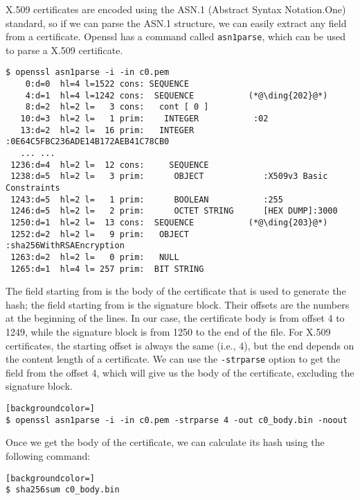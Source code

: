 X.509 certificates are encoded using the ASN.1 (Abstract Syntax Notation.One) standard, 
so if we can parse the ASN.1 structure, we can easily extract any field from a certificate. 
Openssl has a command called \texttt{asn1parse}, which can be used 
to parse a X.509 certificate. 


\begin{lstlisting}
$ openssl asn1parse -i -in c0.pem
    0:d=0  hl=4 l=1522 cons: SEQUENCE          
    4:d=1  hl=4 l=1242 cons:  SEQUENCE           (*@\ding{202}@*)
    8:d=2  hl=2 l=   3 cons:   cont [ 0 ]        
   10:d=3  hl=2 l=   1 prim:    INTEGER           :02
   13:d=2  hl=2 l=  16 prim:   INTEGER           :0E64C5FBC236ADE14B172AEB41C78CB0
   ... ...
 1236:d=4  hl=2 l=  12 cons:     SEQUENCE          
 1238:d=5  hl=2 l=   3 prim:      OBJECT            :X509v3 Basic Constraints
 1243:d=5  hl=2 l=   1 prim:      BOOLEAN           :255
 1246:d=5  hl=2 l=   2 prim:      OCTET STRING      [HEX DUMP]:3000
 1250:d=1  hl=2 l=  13 cons:  SEQUENCE           (*@\ding{203}@*)
 1252:d=2  hl=2 l=   9 prim:   OBJECT            :sha256WithRSAEncryption
 1263:d=2  hl=2 l=   0 prim:   NULL              
 1265:d=1  hl=4 l= 257 prim:  BIT STRING        
\end{lstlisting}


The field starting from  is the body of the certificate that is used to generate the hash; the
field starting from  is the signature block. Their offsets are the numbers at the beginning 
of the lines. In our case, the certificate body is from offset 4 to 1249, while the 
signature block is from 1250 to the end of the file. For X.509 certificates, the starting
offset is always the same (i.e., 4), but the end depends on the content length of a
certificate.  We can use the 
\texttt{-strparse} option to get the field from the offset 4, which will give us the body of
the certificate, excluding the signature block.  

\begin{lstlisting}[backgroundcolor=]
$ openssl asn1parse -i -in c0.pem -strparse 4 -out c0_body.bin -noout
\end{lstlisting}

Once we get the body of the certificate, we can calculate its hash using the following
command: 

\begin{lstlisting}[backgroundcolor=]
$ sha256sum c0_body.bin
\end{lstlisting}



